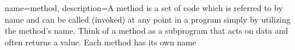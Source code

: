 {
    name=method,
    description={A method is a set of code which is referred to by name and can be called (invoked) at any point in a program simply by utilizing the method's name. Think of a method as a subprogram that acts on data and often returns a value. Each method has its own name}
}
